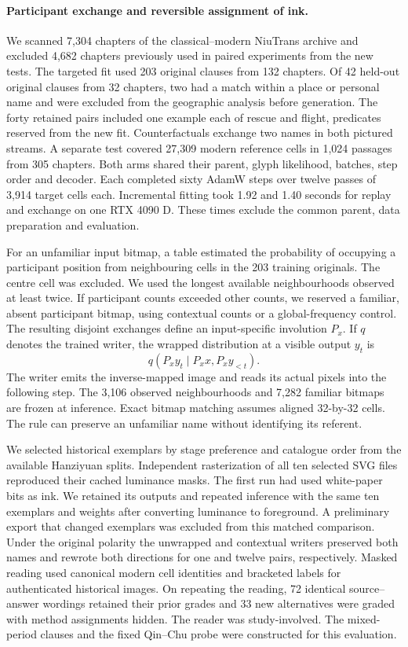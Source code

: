 \paragraph{Participant exchange and reversible assignment of ink.}
We scanned 7,304 chapters of the classical--modern NiuTrans archive and excluded 4,682 chapters previously used in paired experiments from the new tests. The targeted fit used 203 original clauses from 132 chapters. Of 42 held-out original clauses from 32 chapters, two had a match within a place or personal name and were excluded from the geographic analysis before generation. The forty retained pairs included one example each of rescue and flight, predicates reserved from the new fit. Counterfactuals exchange two names in both pictured streams. A separate test covered 27,309 modern reference cells in 1,024 passages from 305 chapters. Both arms shared their parent, glyph likelihood, batches, step order and decoder. Each completed sixty AdamW steps over twelve passes of 3,914 target cells each. Incremental fitting took 1.92 and 1.40 seconds for replay and exchange on one RTX 4090 D. These times exclude the common parent, data preparation and evaluation.

For an unfamiliar input bitmap, a table estimated the probability of occupying a participant position from neighbouring cells in the 203 training originals. The centre cell was excluded. We used the longest available neighbourhoods observed at least twice. If participant counts exceeded other counts, we reserved a familiar, absent participant bitmap, using contextual counts or a global-frequency control. The resulting disjoint exchanges define an input-specific involution $P_x$. If $q$ denotes the trained writer, the wrapped distribution at a visible output $y_t$ is
\[
 q(P_x y_t\mid P_x x, P_x y_{<t}).
\]
The writer emits the inverse-mapped image and reads its actual pixels into the following step. The 3,106 observed neighbourhoods and 7,282 familiar bitmaps are frozen at inference. Exact bitmap matching assumes aligned 32-by-32 cells. The rule can preserve an unfamiliar name without identifying its referent.

We selected historical exemplars by stage preference and catalogue order from the available Hanziyuan splits. Independent rasterization of all ten selected SVG files reproduced their cached luminance masks. The first run had used white-paper bits as ink. We retained its outputs and repeated inference with the same ten exemplars and weights after converting luminance to foreground. A preliminary export that changed exemplars was excluded from this matched comparison. Under the original polarity the unwrapped and contextual writers preserved both names and rewrote both directions for one and twelve pairs, respectively. Masked reading used canonical modern cell identities and bracketed labels for authenticated historical images. On repeating the reading, 72 identical source--answer wordings retained their prior grades and 33 new alternatives were graded with method assignments hidden. The reader was study-involved. The mixed-period clauses and the fixed Qin--Chu probe were constructed for this evaluation.
